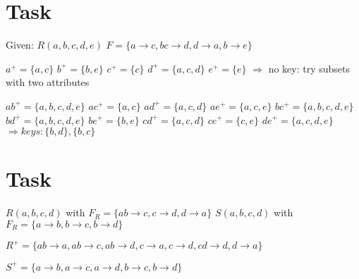 \documentclass{article}
\begin{document}
\section{Task}
\par Given: \newline
$R(a, b, c, d, e)$ \newline
$F = \{  
        a \rightarrow c,
        bc \rightarrow d,
        d \rightarrow a,
        b \rightarrow e
    \}$
\par
$a^{+} = \{a, c \}$ \newline
$b^{+} = \{b, e \}$ \newline
$c^{+} = \{c \}$ \newline
$d^{+} = \{a, c, d \}$ \newline
$e^{+} = \{e \}$ \newline
$\Rightarrow$ no key: try subsets with two attributes

\par
$ab^{+} = \{a, b, c, d, e \}$ \newline
$ac^{+} = \{a, c \}$ \newline
$ad^{+} = \{a, c, d \}$ \newline
$ae^{+} = \{a, c, e \}$ \newline
$bc^{+} = \{a, b, c, d, e \}$ \newline
$bd^{+} = \{a, b, c, d, e \}$ \newline
$be^{+} = \{b, e \}$ \newline
$cd^{+} = \{a, c, d \}$ \newline
$ce^{+} = \{c, e \}$ \newline
$de^{+} = \{a, c, d, e \}$ \newline
$\Rightarrow keys: \{b, d\}, \{b, c\}$ 

\section{Task}
$R(a, b, c, d)$ with $F_{R} = \{ ab \rightarrow c, c \rightarrow d, d \rightarrow a \}$ \newline
$S(a, b, c, d)$ with $F_{R} = \{ a \rightarrow b, b \rightarrow c, b \rightarrow d \}$

$R^{+} = \{ 
            ab \rightarrow a,
            ab \rightarrow c,
            ab \rightarrow d,
            c \rightarrow a,
            c \rightarrow d,
            cd \rightarrow d,
            d \rightarrow a
        \}$

$S^{+} = \{
            a \rightarrow b,
            a \rightarrow c, 
            a \rightarrow d, 
            b \rightarrow c, 
            b \rightarrow d
        \}$
\newpage
\end{document}

